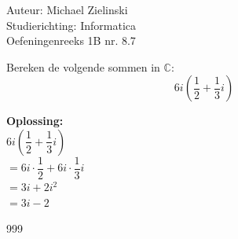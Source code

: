\documentclass[a4paper]{article}
\begin{document}
  
\noindent \large Auteur: Michael Zielinski \\
\noindent \large Studierichting: Informatica\\
\noindent \large Oefeningenreeks 1B nr. 8.7\\

\medskip

\normalsize
	Bereken de volgende sommen in $\mathbb{C}$:
	\begin{equation*}
		6i\left(\dfrac{1}{2} + \dfrac{1}{3}i\right)
	\end{equation*}
	
	
	\textbf{Oplossing:}\\
	
	$ 6i\left(\dfrac{1}{2} + \dfrac{1}{3}i\right) $ \\	
	
	$= 6i \cdot \dfrac{1}{2} + 6i \cdot \dfrac{1}{3}i $ \\	
	
	$= 3i + 2i^{2} $ \\	
	
	$= 3i - 2 $ \\
	
\begin{thebibliography}{999}
\end{thebibliography}
\end{document}
